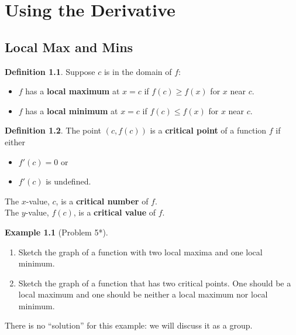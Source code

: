 \documentclass[oneside]{book}
\newcommand{\define}[1]{\textbf{#1}}
\theoremstyle{definition}
\newtheorem{example}{Example}
\newtheorem{definition}{Definition}[section]
\theoremstyle{solution}
\newtheorem*{solution}{Solution}
\newenvironment{solution}{\vspace{2in}\comment}{\endcomment}
\begin{document}
\chapter{Using the Derivative}
\section{Local Max and Mins}

\begin{definition}
Suppose $c$ is in the domain of $f$:
\begin{itemize}
\item $f$ has a \define{local maximum} at $x=c$ if $f(c) \ge f(x)$ for $x$ near $c$.
  
\item $f$ has a \define{local minimum} at $x=c$ if $f(c) \le f(x)$ for $x$ near $c$.
\end{itemize}
\end{definition}



\begin{definition}
The point $(c,f(c))$ is a \define{critical point} of a function $f$ if either
  \begin{itemize}
  \item $f'(c) = 0$ or
  \item $f'(c)$ is undefined.
  \end{itemize}

The $x$-value, $c$, is a \define{critical number} of $f$.\\
The $y$-value, $f(c)$, is a \define{critical value} of $f$.    
\end{definition}



\begin{example}[Problem 5*]
  \begin{enumerate}
  \item Sketch the graph of a function with two local maxima and one
    local minimum.
  \item Sketch the graph of a function that has two critical points.
    One should be a local maximum and one should be neither a local
    maximum nor local minimum.
  \end{enumerate}
\end{example}

\begin{solution}
There is no ``solution'' for this example: we will discuss it as a group.  
\end{solution}
\end{document}
